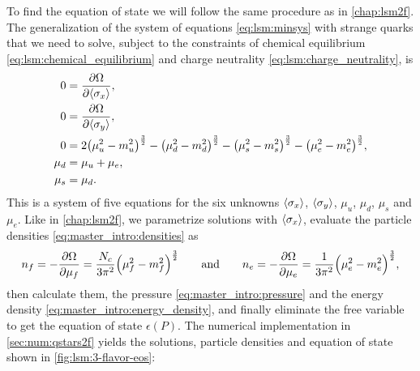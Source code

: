 To find the equation of state we will follow the same procedure as in \cref{chap:lsm2f}.
The generalization of the system of equations \eqref{eq:lsm:minsys} with strange quarks that we need to solve,
subject to the constraints of chemical equilibrium \eqref{eq:lsm:chemical_equilibrium} and charge neutrality \eqref{eq:lsm:charge_neutrality},
is
\begin{subequations}
\begin{align}
	0 &= \pdv{\Omega}{ \langle \sigma_x \rangle} , \label{eq:lsm3f:minsys_minx} \\
	0 &= \pdv{\Omega}{ \langle \sigma_y \rangle} , \label{eq:lsm3f:minsys_miny} \\
	0 &= 2 \big(\mu_u^2-m_u^2\big)^\frac32 - \big(\mu_d^2-m_d^2\big)^\frac32 - \big(\mu_s^2-m_s^2\big)^\frac32 - \big(\mu_e^2-m_e^2\big)^\frac32 \label{eq:lsm:minsys3f_charge}, \\
	\mu_d &= \mu_u + \mu_e, \\
	\mu_s &= \mu_d .
\end{align}%
\label{eq:lsm3f:minsys}%
\end{subequations}%
This is a system of five equations for the six unknowns
$\langle \sigma_x \rangle$, $\langle \sigma_y \rangle$, $\mu_u$, $\mu_d$, $\mu_s$ and $\mu_e$.
Like in \cref{chap:lsm2f},
we parametrize solutions with $\langle \sigma_x \rangle$,
evaluate the particle densities \eqref{eq:master_intro:densities} as
\begin{equation}
	n_f = -\pdv{\Omega}{\mu_f} = \frac{N_c}{3 \pi^2} \Big( \mu_f^2 - m_f^2 \Big)^{\frac32}
	\qquad \text{and} \qquad
	n_e = -\pdv{\Omega}{\mu_e} = \frac{  1}{3 \pi^2} \Big( \mu_e^2 - m_e^2 \Big)^{\frac32},
\label{eq:lsm3f:particle_densities}
\end{equation}%
then calculate them, the pressure \eqref{eq:master_intro:pressure} and the energy density \eqref{eq:master_intro:energy_density},
and finally eliminate the free variable to get the equation of state $\epsilon(P)$.
The numerical implementation in \cref{sec:num:qstars2f} yields
the solutions, particle densities and equation of state shown in \cref{fig:lsm:3-flavor-eos}:
